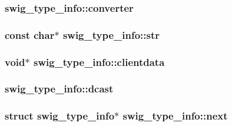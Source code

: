\hypertarget{structswig__type__info_355c576100fcadcc7f75ade38fa85c24}{
\subsubsection{ {\bf swig\_\-type\_\-info::converter}}}
\label{structswig__type__info_355c576100fcadcc7f75ade38fa85c24}


\hypertarget{structswig__type__info_bbe7cc58a083feb4329b748643324064}{
\subsubsection{\setlength{\rightskip}{0pt plus 5cm}const char$\ast$ {\bf swig\_\-type\_\-info::str}}}
\label{structswig__type__info_bbe7cc58a083feb4329b748643324064}


\hypertarget{structswig__type__info_19bdd65dceb89cd54befd3ded06558b7}{
\subsubsection{\setlength{\rightskip}{0pt plus 5cm}void$\ast$ {\bf swig\_\-type\_\-info::clientdata}}}
\label{structswig__type__info_19bdd65dceb89cd54befd3ded06558b7}


\hypertarget{structswig__type__info_07df4bedf85be77b23756b531b60e0dd}{
\subsubsection{ {\bf swig\_\-type\_\-info::dcast}}}
\label{structswig__type__info_07df4bedf85be77b23756b531b60e0dd}


\hypertarget{structswig__type__info_6c16b30e9cd94004bb71d92bfc859ee5}{
\subsubsection{\setlength{\rightskip}{0pt plus 5cm}struct {\bf swig\_\-type\_\-info}$\ast$ {\bf swig\_\-type\_\-info::next}}}
\label{structswig__type__info_6c16b30e9cd94004bb71d92bfc859ee5}


